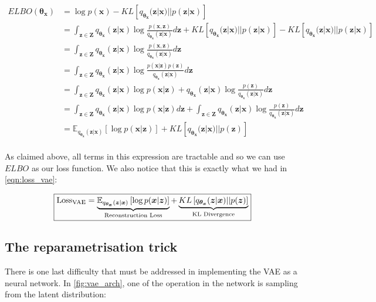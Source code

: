             \begin{align*}
                ELBO(\bm{\theta_x}) &= \log p(\bm{x}) - KL\left[q_{\bm{\theta_x}}(\bm{z}|\bm{x}) || p(\bm{z}|\bm{x})\right]\\
                &= \int_{\bm{z} \in \bm{Z}} q_{\bm{\theta_x}}(\bm{z}|\bm{x}) \log \frac{p(\bm{x}, \bm{z})}{q_{\bm{\theta_x}}(\bm{z}|\bm{x})} d\bm{z} + KL\left[q_{\bm{\theta_x}}(\bm{z}|\bm{x}) || p(\bm{z}|\bm{x})\right] - KL\left[q_{\bm{\theta_x}}(\bm{z}|\bm{x}) || p(\bm{z}|\bm{x})\right]\\
                &= \int_{\bm{z} \in \bm{Z}} q_{\bm{\theta_x}}(\bm{z}|\bm{x}) \log \frac{p(\bm{x}, \bm{z})}{q_{\bm{\theta_x}}(\bm{z}|\bm{x})} d\bm{z}\\
                &= \int_{\bm{z} \in \bm{Z}} q_{\bm{\theta_x}}(\bm{z}|\bm{x}) \log \frac{p(\bm{x} | \bm{z})p(\bm{z})}{q_{\bm{\theta_x}}(\bm{z}|\bm{x})} d\bm{z}\\
                &= \int_{\bm{z} \in \bm{Z}} q_{\bm{\theta_x}}(\bm{z}|\bm{x}) \log p(\bm{x} | \bm{z}) + q_{\bm{\theta_x}}(\bm{z}|\bm{x}) \log \frac{p(\bm{z})}{q_{\bm{\theta_x}}(\bm{z}|\bm{x})} d\bm{z}\\
                &= \int_{\bm{z} \in \bm{Z}} q_{\bm{\theta_x}}(\bm{z}|\bm{x}) \log p(\bm{x} | \bm{z}) d\bm{z} + \int_{\bm{z} \in \bm{Z}} q_{\bm{\theta_x}}(\bm{z}|\bm{x}) \log \frac{p(\bm{z})}{q_{\bm{\theta_x}}(\bm{z}|\bm{x})} d\bm{z}\\
                &= \mathbb{E}_{q_{\bm{\theta_x}}(\bm{z}|\bm{x})} \left[\log p(\bm{x} | \bm{z}) \right] + KL\left[q_{\bm{\theta_x}}(\bm{z}|\bm{x}) || p(\bm{z})\right]\\
            \end{align*}
            
            As claimed above, all terms in this expression are tractable and so we can use $ELBO$ as our loss function. We also notice that this is exactly what we had in \ref{eqn:loss_vae}:
            
            \[ \boxed{\text{Loss\textsubscript{VAE}} = \underbrace{\mathbb{E}_{q_{\bm{\theta_x}}(\bm{z}|\bm{x})} \left[\log p(\bm{x} | \bm{z}) \right]}_\textrm{Reconstruction Loss} + \underbrace{KL\left[q_{\bm{\theta_x}}(\bm{z}|\bm{x}) || p(\bm{z})\right]}_\textrm{KL Divergence}} \]
            
        \subsection{The reparametrisation trick}
            There is one last difficulty that must be addressed in implementing the VAE as a neural network. In \ref{fig:vae_arch}, one of the operation in the network is sampling from the latent distribution:
            
